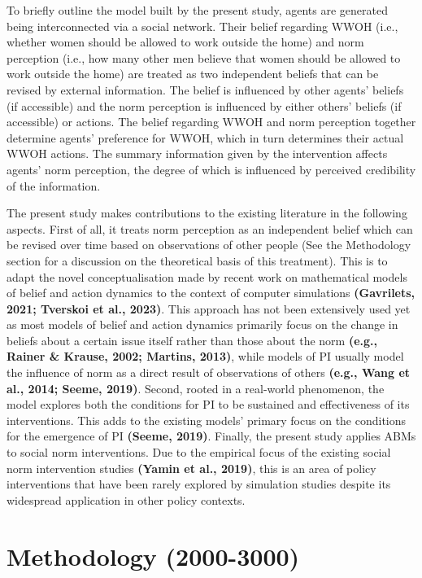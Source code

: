 \documentclass[
  11pt,
]{article}
\begin{document}
To briefly outline the model built by the present study, agents are
generated being interconnected via a social network. Their belief
regarding WWOH (i.e., whether women should be allowed to work outside
the home) and norm perception (i.e., how many other men believe that
women should be allowed to work outside the home) are treated as two
independent beliefs that can be revised by external information. The
belief is influenced by other agents' beliefs (if accessible) and the
norm perception is influenced by either others' beliefs (if accessible)
or actions. The belief regarding WWOH and norm perception together
determine agents' preference for WWOH, which in turn determines their
actual WWOH actions. The summary information given by the intervention
affects agents' norm perception, the degree of which is influenced by
perceived credibility of the information.

The present study makes contributions to the existing literature in the
following aspects. First of all, it treats norm perception as an
independent belief which can be revised over time based on observations
of other people (See the Methodology section for a discussion on the
theoretical basis of this treatment). This is to adapt the novel
conceptualisation made by recent work on mathematical models of belief
and action dynamics to the context of computer simulations
\textbf{(Gavrilets, 2021; Tverskoi et al., 2023)}. This approach has not
been extensively used yet as most models of belief and action dynamics
primarily focus on the change in beliefs about a certain issue itself
rather than those about the norm \textbf{(e.g., Rainer \& Krause, 2002;
Martins, 2013)}, while models of PI usually model the influence of norm
as a direct result of observations of others \textbf{(e.g., Wang et al.,
2014; Seeme, 2019)}. Second, rooted in a real-world phenomenon, the
model explores both the conditions for PI to be sustained and
effectiveness of its interventions. This adds to the existing models'
primary focus on the conditions for the emergence of PI \textbf{(Seeme,
2019)}. Finally, the present study applies ABMs to social norm
interventions. Due to the empirical focus of the existing social norm
intervention studies \textbf{(Yamin et al., 2019)}, this is an area of
policy interventions that have been rarely explored by simulation
studies despite its widespread application in other policy contexts.

\hypertarget{methodology-2000-3000}{%
\section{Methodology (2000-3000)}\label{methodology-2000-3000}}
\end{document}

